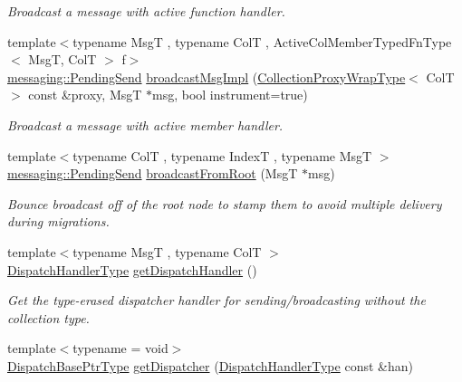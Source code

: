 \begin{DoxyCompactItemize}
\begin{DoxyCompactList}\small\item\em Broadcast a message with active function handler. \end{DoxyCompactList}\item 
{\footnotesize template$<$typename MsgT , typename ColT , Active\+Col\+Member\+Typed\+Fn\+Type$<$ Msg\+T, Col\+T $>$ f$>$ }\\\hyperlink{structvt_1_1messaging_1_1_pending_send}{messaging\+::\+Pending\+Send} \hyperlink{structvt_1_1vrt_1_1collection_1_1_collection_manager_ac7a9c72784d76ddf0346926bbb147e8c}{broadcast\+Msg\+Impl} (\hyperlink{structvt_1_1vrt_1_1collection_1_1_collection_manager_a56458ed7f9bb22b631b9b3a745f42f94}{Collection\+Proxy\+Wrap\+Type}$<$ ColT $>$ const \&proxy, MsgT $\ast$msg, bool instrument=true)
\begin{DoxyCompactList}\small\item\em Broadcast a message with active member handler. \end{DoxyCompactList}\item 
{\footnotesize template$<$typename ColT , typename IndexT , typename MsgT $>$ }\\\hyperlink{structvt_1_1messaging_1_1_pending_send}{messaging\+::\+Pending\+Send} \hyperlink{structvt_1_1vrt_1_1collection_1_1_collection_manager_a53567bdf285983b92dd4094721f8a4fd}{broadcast\+From\+Root} (MsgT $\ast$msg)
\begin{DoxyCompactList}\small\item\em Bounce broadcast off of the root node to stamp them to avoid multiple delivery during migrations. \end{DoxyCompactList}\item 
{\footnotesize template$<$typename MsgT , typename ColT $>$ }\\\hyperlink{structvt_1_1vrt_1_1collection_1_1_collection_manager_a0cfe02a0426e95ec9daa2ef7374e07c7}{Dispatch\+Handler\+Type} \hyperlink{structvt_1_1vrt_1_1collection_1_1_collection_manager_ab672ad6c3bc9fdc5a9577a9ae0677d1f}{get\+Dispatch\+Handler} ()
\begin{DoxyCompactList}\small\item\em Get the type-\/erased dispatcher handler for sending/broadcasting without the collection type. \end{DoxyCompactList}\item 
{\footnotesize template$<$typename  = void$>$ }\\\hyperlink{namespacevt_1_1vrt_1_1collection_aa3b9731ae16d60fac43d68840f3606a5}{Dispatch\+Base\+Ptr\+Type} \hyperlink{structvt_1_1vrt_1_1collection_1_1_collection_manager_af183a018e0d2d8b3ed024244d8f83f45}{get\+Dispatcher} (\hyperlink{structvt_1_1vrt_1_1collection_1_1_collection_manager_a0cfe02a0426e95ec9daa2ef7374e07c7}{Dispatch\+Handler\+Type} const \&han)

\end{DoxyCompactItemize}
